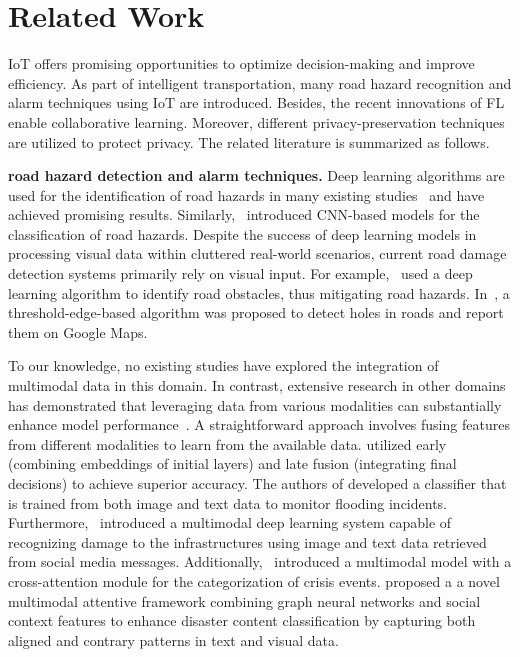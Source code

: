 \section{Related Work}
\label{sec:RelatedWork}
IoT offers promising opportunities to optimize decision-making and improve efficiency. As part of intelligent transportation, many road hazard recognition and alarm techniques using IoT are introduced. Besides, the recent innovations of FL enable collaborative learning. Moreover, different privacy-preservation techniques are utilized to protect privacy. The related literature is summarized as follows.

\textbf{road hazard detection and alarm techniques.}
Deep learning algorithms are used for the identification of road hazards in many existing studies~\cite{pauly2017deeper,Hoai2017,maeda2018road,EcRD,FedRD,zhao2024community,saha2024federated} and have achieved promising results. 
Similarly,~\cite{maeda2018road,FedRD,zhao2024community,saha2024federated} introduced CNN-based models for the classification of road hazards. Despite the success of deep learning models in processing visual data within cluttered real-world scenarios, current road damage detection systems primarily rely on visual input. For example,~\cite{wang2021assistant} used a deep learning algorithm to identify road obstacles, thus mitigating road hazards.
In~\cite{sulistyowati2021monitoring}, a threshold-edge-based algorithm was proposed to detect holes in roads and report them on Google Maps.

To our knowledge, no existing studies have explored the integration of multimodal data in this domain. In contrast, extensive research in other domains has demonstrated that leveraging data from various modalities can substantially enhance model performance~\cite{ofli2020analysis,gallo2018image,praneshexploring,abavisani2020multimodal}. A straightforward approach involves fusing features from different modalities to learn from the available data. 
\cite{lan2014multimedia} utilized early (combining embeddings of initial layers) and late fusion (integrating final decisions) to achieve superior accuracy. The authors of \cite{kelly2017mining} developed a classifier that is trained from both image and text data to monitor flooding incidents. 
Furthermore,~\cite{mouzannar2018damage} introduced a multimodal deep learning system capable of recognizing damage to the infrastructures using image and text data retrieved from social media messages. Additionally,~\cite{abavisani2020multimodal} introduced a multimodal model with a cross-attention module for the categorization of crisis events.
\cite{dar2025social} proposed a a novel multimodal attentive framework combining graph neural networks and social context features to enhance disaster content classification by capturing both aligned and contrary patterns in text and visual data.

